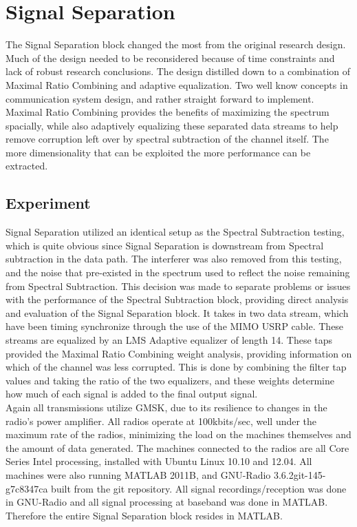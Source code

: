 \section{Signal Separation}

The Signal Separation block changed the most from the original research design.  Much of the design needed to be reconsidered because of time constraints and lack of robust research conclusions.  The design distilled down to a combination of Maximal Ratio Combining and adaptive equalization.  Two well know concepts in communication system design, and rather straight forward to implement.  Maximal Ratio Combining provides the benefits of maximizing the spectrum spacially, while also adaptively equalizing these separated data streams to help remove corruption left over by spectral subtraction of the channel itself.  The more dimensionality that can be exploited the more performance can be extracted.\\

\subsection{Experiment}

Signal Separation utilized an identical setup as the Spectral Subtraction testing, which is quite obvious since Signal Separation is downstream from Spectral subtraction in the data path.  The interferer was also removed from this testing, and the noise that pre-existed in the spectrum used to reflect the noise remaining from Spectral Subtraction.  This decision was made to separate problems or issues with the performance of the Spectral Subtraction block, providing direct analysis and evaluation of the Signal Separation block.  It takes in two data stream, which have been timing synchronize through the use of the MIMO USRP cable.  These streams are equalized by an LMS Adaptive equalizer of length 14.  These taps provided the Maximal Ratio Combining weight analysis, providing information on which of the channel was less corrupted.  This is done by combining the filter tap values and taking the ratio of the two equalizers, and these weights determine how much of each signal is added to the final output signal.\\ 

Again all transmissions utilize GMSK, due to its resilience to changes in the radio's power amplifier.  All radios operate at 100kbits/sec, well under the maximum rate of the radios, minimizing the load on the machines themselves and the amount of data generated.  The machines connected to the radios are all Core Series Intel processing, installed with Ubuntu Linux 10.10 and 12.04.  All machines were also running MATLAB 2011B, and GNU-Radio 3.6.2git-145-g7c8347ca built from the git repository.  All signal recordings/reception was done in GNU-Radio and all signal processing at baseband was done in MATLAB.  Therefore the entire Signal Separation block resides in MATLAB.\\  

